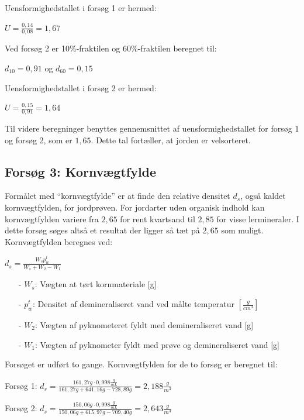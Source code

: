 Uensformighedstallet i forsøg 1 er hermed:
\begin{center}
	$U = \frac{0,\!14}{0,\!08} = 1,\!67$
\end{center}

Ved forsøg 2 er 10\%-fraktilen og 60\%-fraktilen beregnet til:
\begin{center}
	$d_{10} = 0,\!91$ og $d_{60} = 0,\!15$
\end{center} 

Uensformighedstallet i forsøg 2 er hermed:
\begin{center}
	$U = \frac{0,\!15}{0,\!91} = 1,\!64$
\end{center}

Til videre beregninger benyttes gennemsnittet af uensformighedstallet for forsøg 1 og forsøg 2, som er $1,\!65$. Dette tal fortæller, at jorden er velsorteret. 

\subsection{Forsøg 3: Kornvægtfylde}
Formålet med “kornvægtfylde” er at finde den relative densitet $d_s$, også kaldet kornvægtfylden, for jordprøven. For jordarter uden organisk indhold kan kornvægtfylden variere fra $2,\!65$ for rent kvartsand til $2,\!85$ for visse lermineraler. I dette forsøg søges altså et resultat der ligger så tæt på $2,\!65$ som muligt.
\newline
\newline
Kornvægtfylden beregnes ved:

\begin{center}
	$d_s = \frac{W_s p_w^t}{W_s + W_2 - W_1}$
\end{center}

\begin{itemize}
	\item[-] $W_s$: Vægten at tørt kornmateriale [g]
	\item[-] $p_w^t$: Densitet af demineraliseret vand ved målte temperatur $[\frac{g}{cm^3}]$
	\item[-] $W_2$: Vægten af pyknometeret fyldt med demineraliseret vand [g]
	\item[-] $W_1$: Vægten af pyknometer fyldt med prøve og demineraliseret vand [g]
\end{itemize}

Forsøget er udført to gange. Kornvægtfylden for de to forsøg er beregnet til:

\begin{center}
	Forsøg 1: $d_{s} = \frac{161,\!27 g \cdot 0,\!998 \frac{g}{mL}}{161,\!27 g + 641,\!16 g - 728,\!89 g} = 2,\!188 \frac{g}{m^3}$
\end{center}
\begin{center}
	Forsøg 2: $d_{s} = \frac{150,\!06 g \cdot 0,\!998 \frac{g}{mL}}{150,\!06 g + 615,\!97 g - 709,\!40 g} = 2,\!643 \frac{g}{m^3}$
\end{center} 

